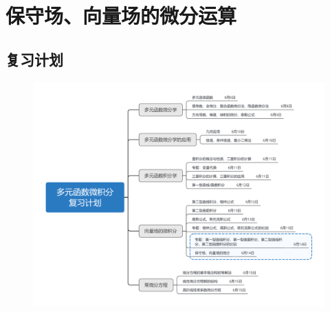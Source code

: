 \documentclass[12pt,UTF8,fleqn]{ctexart}
\begin{document}
\setcounter{section}{13}
\section{保守场、向量场的微分运算}
\subsection{复习计划}
\begin{figure}[H]
\begin{center}
\includegraphics[height=0.5\textheight]{Figures20190614/plan.png}
\end{center}
\end{figure}
\end{document}
